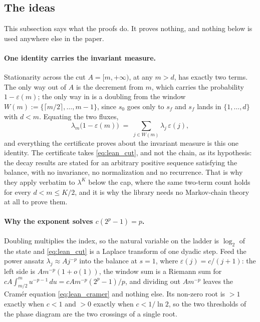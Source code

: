\subsection{The ideas}\label{sec:lean_ideas}

This subsection says what the proofs do. It proves nothing, and nothing below is used anywhere
else in the paper.

\paragraph{One identity carries the invariant measure.}
Stationarity across the cut $A=[m,+\infty)$, at any $m>d$, has exactly two terms. The only way
out of $A$ is the decrement from $m$, which carries the probability $1-\varepsilon(m)$; the
only way in is a doubling from the window $W(m):=\{\lceil m/2\rceil,\dots,m-1\}$, since $s_0$
goes only to $s_f$ and $s_f$ lands in $\{1,\dots,d\}$ with $d<m$. Equating the two fluxes,
\begin{equation}\label{eq:lean_cut}
    \lambda_m\bigl(1-\varepsilon(m)\bigr)\;=\;\sum_{j\in W(m)}\lambda_j\,\varepsilon(j) ,
\end{equation}
and everything the certificate proves about the invariant measure is this one identity. The
certificate takes \eqref{eq:lean_cut}, and not the chain, as its hypothesis: the decay results
are stated for an arbitrary positive sequence satisfying the balance, with no invariance, no
normalization and no recurrence. That is why they apply verbatim to $\lambda^K$ below the cap,
where the same two-term count holds for every $d<m\leq K/2$, and it is why the library needs no
Markov-chain theory at all to prove them.

\paragraph{Why the exponent solves $c(2^p-1)=p$.}
Doubling multiplies the index, so the natural variable on the ladder is $\log_2$ of the state
and \eqref{eq:lean_cut} is a Laplace transform of one dyadic step. Feed the power ansatz
$\lambda_j\approx A j^{-p}$ into the balance at $s=1$, where $\varepsilon(j)=c/(j+1)$: the left
side is $Am^{-p}(1+o(1))$, the window sum is a Riemann sum for
$cA\int_{m/2}^mu^{-p-1}\,du=cAm^{-p}(2^p-1)/p$, and dividing out $Am^{-p}$ leaves the
Cram\'er equation \eqref{eq:lean_cramer} and nothing else. Its non-zero root is $>1$ exactly
when $c<1$ and $>0$ exactly when $c<1/\ln2$, so the two thresholds of the phase diagram are the
two crossings of a single root.

